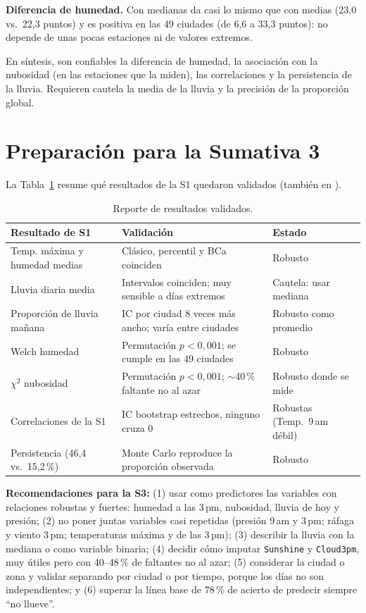 \documentclass[11pt,a4paper]{article}
\begin{document}
\textbf{Diferencia de humedad.} Con medianas da casi lo mismo que con medias (23,0 vs.\ 22,3 puntos) y es positiva en las 49 ciudades (de 6,6 a 33,3 puntos): no depende de unas pocas estaciones ni de valores extremos.

En síntesis, son confiables la diferencia de humedad, la asociación con la nubosidad (en las estaciones que la miden), las correlaciones y la persistencia de la lluvia. Requieren cautela la media de la lluvia y la precisión de la proporción global.

\section{Preparación para la Sumativa 3}
La Tabla~\ref{tab:val} resume qué resultados de la S1 quedaron validados (también en ).

\begin{table}[H]
\centering\small
\caption{Reporte de resultados validados.}
\label{tab:val}
\begin{tabular}{@{}>{\raggedright\arraybackslash}p{4.2cm}>{\raggedright\arraybackslash}p{6.3cm}>{\raggedright\arraybackslash}p{3.6cm}@{}}
\toprule
Resultado de S1 & Validación & Estado\\
\midrule
Temp. máxima y humedad medias & Clásico, percentil y BCa coinciden & Robusto\\
Lluvia diaria media & Intervalos coinciden; muy sensible a días extremos & Cautela: usar mediana\\
Proporción de lluvia mañana & IC por ciudad 8 veces más ancho; varía entre ciudades & Robusto como promedio\\
Welch humedad & Permutación $p<0{,}001$; se cumple en las 49 ciudades & Robusto\\
$\chi^2$ nubosidad & Permutación $p<0{,}001$; $\sim$40\,\% faltante no al azar & Robusto donde se mide\\
Correlaciones de la S1 & IC bootstrap estrechos, ninguno cruza 0 & Robustas (Temp.\ 9\,am débil)\\
Persistencia (46,4 vs.\ 15,2\,\%) & Monte Carlo reproduce la proporción observada & Robusto\\
\bottomrule
\end{tabular}
\end{table}

\textbf{Recomendaciones para la S3:} (1) usar como predictores las variables con relaciones robustas y fuertes: humedad a las 3\,pm, nubosidad, lluvia de hoy y presión; (2) no poner juntas variables casi repetidas (presión 9\,am y 3\,pm; ráfaga y viento 3\,pm; temperaturas máxima y de las 3\,pm); (3) describir la lluvia con la mediana o como variable binaria; (4) decidir cómo imputar \texttt{Sunshine} y \texttt{Cloud3pm}, muy útiles pero con 40--48\,\% de faltantes no al azar; (5) considerar la ciudad o zona y validar separando por ciudad o por tiempo, porque los días no son independientes; y (6) superar la línea base de 78\,\% de acierto de predecir siempre ``no llueve''.
\end{document}
